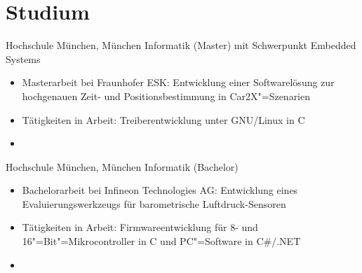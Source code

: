 \documentclass[%
               doublesided,
               paper=a4,
               fontsize=10pt
              ]{my-resume}
\begin{document}
{    \section[\faMortarBoard]{Studium}
        {Hochschule München, München}
        {Informatik (Master) mit Schwerpunkt Embedded Systems}
        {\begin{itemize}
            \item Masterarbeit bei Fraunhofer ESK: Entwicklung einer Softwarelösung zur hochgenauen Zeit- und Positionsbestimmung in Car2X"=Szenarien
            \item Tätigkeiten in Arbeit: Treiberentwicklung unter GNU/Linux in C
            \item[]  
        \end{itemize}}
    
        {Hochschule München, München}
        {Informatik (Bachelor)}
        {\begin{itemize}
            \item Bachelorarbeit bei Infineon Technologies AG: Entwicklung eines Evaluierungswerkzeugs für barometrische Luftdruck-Sensoren
            \item Tätigkeiten in Arbeit: Firmwareentwicklung für 8- und 16"=Bit"=Mikrocontroller in C und PC"=Software in C\#/.NET
            \item[]   
        \end{itemize}}
    
}
\makebody
\clearpage
\end{document}
